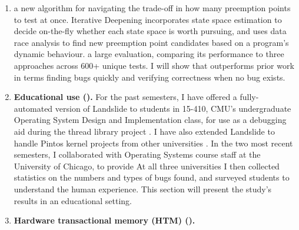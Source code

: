 \begin{enumerate}
	\item {}
		a new algorithm for navigating the trade-off in how many preemption points to test at once.
		Iterative Deepening incorporates state space estimation \cite{estimation}
		to decide on-the-fly whether each state space is worth pursuing,
		and uses data race analysis \cite{tsan,fasttrack}
		to find new preemption point candidates based on a program's dynamic behaviour.
		a large evaluation, comparing its performance to three  approaches
		across 600+ unique tests.
		I will show that 
		outperforms prior work in terms  finding bugs quickly
		and verifying correctness when no bug exists.
	\item {\bf Educational use ().}
		For the past  semesters,
		I have offered a fully-automated version of Landslide to students in 15-410,
		CMU's undergraduate Operating System Design and Implementation class,
		for use as a debugging aid during the thread library project \cite{thrlib}.
		I have also extended Landslide to handle Pintos kernel projects from other universities \cite{pintos}.
		In the two most recent semesters, I collaborated with Operating Systems course staff at the University of Chicago,
		to provide
		At all three universities I then collected statistics on the numbers and types of bugs found,
		and surveyed students to understand the human experience.
		This section will present the study's results
		 in an educational setting.
	\item {\bf Hardware transactional memory (HTM) ().}

\end{enumerate}
